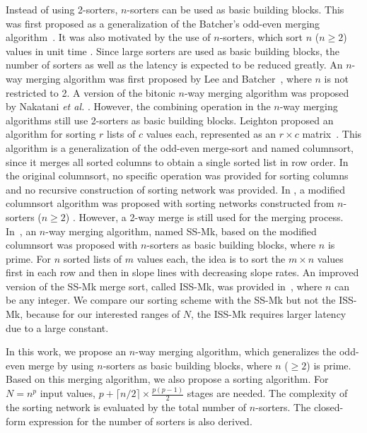 \documentclass[10pt,journal,cspaper,compsoc]{IEEEtran}
\begin{document}
Instead of using 2-sorters, $n$-sorters can be used as basic building blocks. This was first proposed as a generalization of the Batcher's odd-even merging algorithm~\cite{Lee95multiway}. It was also motivated by the use of $n$-sorters, which sort $n$ ($n\ge 2$) values in unit time \cite{parker1989constructing,beigel1990sorting}. Since large sorters are used as basic building blocks, the number of sorters as well as the latency is expected to be reduced greatly.
An $n$-way merging algorithm was first proposed by Lee and Batcher~\cite{Lee95multiway}, where $n$ is not restricted to 2. A version of the bitonic $n$-way merging algorithm was proposed by Nakatani \textit{et al.} \cite{nakatani1989e1,lee1994sorting}. However, the combining operation in the $n$-way merging algorithms still use 2-sorters as basic building blocks. Leighton proposed an algorithm for sorting $r$ lists of $c$ values each, represented as an $r \times c$ matrix~\cite{leighton1984tight}. This algorithm is a generalization of the odd-even merge-sort and named columnsort, since it merges all sorted columns to obtain a single sorted list in row order. In the original columnsort, no specific operation was provided for sorting columns and no recursive construction of sorting network was provided. In \cite{parker1989constructing}, a modified columnsort algorithm was proposed with sorting networks constructed from $n$-sorters ($n\ge 2$) \cite{liszka1993generalized}. However, a 2-way merge is still used for the merging process.
In~\cite{gao1997sloping}, an $n$-way merging algorithm, named SS-Mk, based on the modified columnsort was proposed with $n$-sorters as basic building blocks, where $n$ is prime. For $n$ sorted lists of $m$ values each, the idea is to sort the $m\times n$ values first in each row and then in slope lines with decreasing slope rates. An improved version of the SS-Mk merge sort, called ISS-Mk, was provided in~\cite{zhao1998efficient}, where $n$ can be any integer. We compare our sorting scheme with the SS-Mk but not the ISS-Mk, because for our interested ranges of $N$, the ISS-Mk requires larger latency due to a large constant.

In this work, we propose an $n$-way merging algorithm, which generalizes the odd-even merge by using $n$-sorters as basic building blocks, where $n$ ($\ge 2$) is prime. Based on this merging algorithm, we also propose a sorting algorithm. For $N = n^{p}$ input values, $p+\lceil n/2 \rceil \times \frac{p(p-1)}{2}$ stages are needed. The complexity of the sorting network is evaluated by the total number of $n$-sorters. The closed-form expression for the number of sorters is also derived.
\end{document}
